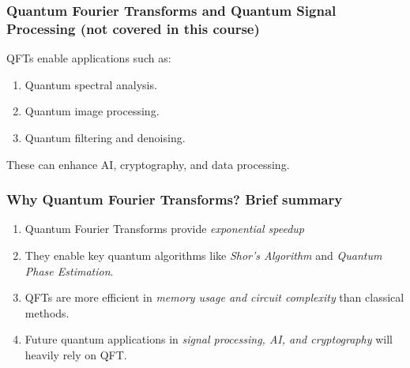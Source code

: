 \documentclass[aspectratio=169]{beamer}
\begin{document}
\begin{frame}
\frametitle{Quantum Fourier Transforms and Quantum Signal Processing (not covered in this course)}

QFTs enable applications such as:
\begin{enumerate}
\item Quantum spectral analysis.

\item Quantum image processing.

\item Quantum filtering and denoising.
\end{enumerate}

\noindent
These can enhance AI, cryptography, and data processing.
\end{frame}

\begin{frame}
\frametitle{Why Quantum Fourier Transforms? Brief summary}

\begin{enumerate}
\item Quantum Fourier Transforms provide \emph{exponential speedup}

\item They enable key quantum algorithms like \emph{Shor’s Algorithm} and \emph{Quantum Phase Estimation}.

\item QFTs are  more efficient in \emph{memory usage and circuit complexity} than classical methods.

\item Future quantum applications in \emph{signal processing, AI, and cryptography} will heavily rely on QFT.
\end{enumerate}

\noindent
\end{frame}
\end{document}
